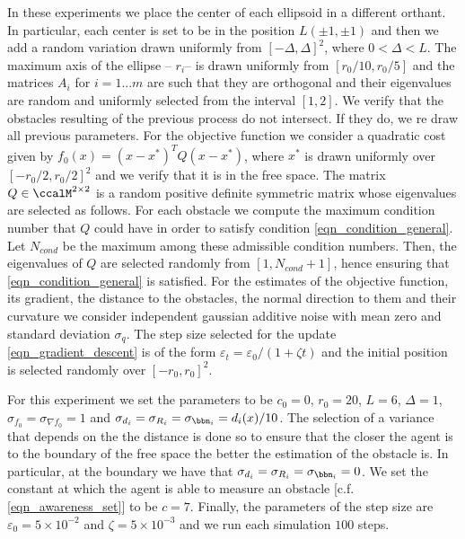 \documentclass[article]{IEEEtran}
\theoremstyle{definition}
\begin{document}
In these experiments we place the center of each ellipsoid in a different orthant. In particular, each center is set to be in the position $L(\pm1,\pm1)$ and then we add a random variation drawn uniformly from $[-\Delta,\Delta]^2$, where $0 < \Delta < L$. The maximum axis of the ellipse -- $r_i $-- is drawn uniformly from $[r_0/10,r_0/5]$ and the matrices $A_i$ for $i = 1 . . . m$ are such that they are orthogonal and their eigenvalues are random and uniformly selected from the interval $[1, 2]$. We verify that the obstacles resulting of the previous process do not intersect. If they do, we re draw all previous parameters. For the objective function we consider a quadratic cost given by $f_0(x)=(x-x^*)^T Q(x-x^*)$, where $x^*$ is drawn uniformly over $[-r_0 /2, r_0 /2]^2$ and we verify that it is in the free space. The matrix $Q \in \ccalM^{2\times 2}$ is a random positive definite symmetric matrix whose eigenvalues are selected as follows. For each obstacle we compute the maximum condition number that $Q$ could have in order to satisfy condition \eqref{eqn_condition_general}. Let $N_{cond}$ be the maximum among these admissible condition numbers. Then, the eigenvalues of $Q$ are selected randomly from $[1, N_{cond} + 1]$, hence ensuring that \eqref{eqn_condition_general} is satisfied. For the estimates of the objective function, its gradient, the distance to the obstacles, the normal direction to them and their curvature we consider independent gaussian additive noise with mean zero and standard deviation $\sigma_{q}$.  The step size selected for the update \eqref{eqn_gradient_descent} is of the form $\varepsilon_t = \varepsilon_0/(1+\zeta t)$ and the initial position is selected randomly over $[-r_0,r_0]^2$. 

For this experiment we set the parameters to be $c_0=0$, $r_0 = 20$, $L=6$, $\Delta = 1$, $\sigma_{f_0} = \sigma_{\nabla f_0} =1$ and $\sigma_{d_i} = \sigma_{R_i} = \sigma_{\bbn_i} = d_i(x)/10$. The selection of a variance that depends on the the distance is done so to ensure that the closer the agent is to the boundary of the free space the better the estimation of the obstacle is. In particular, at the boundary we have that $\sigma_{d_i} = \sigma_{R_i} = \sigma_{\bbn_i}=0$. We set the constant at which the agent is able to measure an obstacle [c.f. \eqref{eqn_awareness_set}] to be $c=7$. Finally, the parameters of the step size are $\varepsilon_0 = 5\times 10^{-2}$ and $\zeta =5\times 10^{-3}$ and we run each simulation $100$ steps. 
\end{document}
